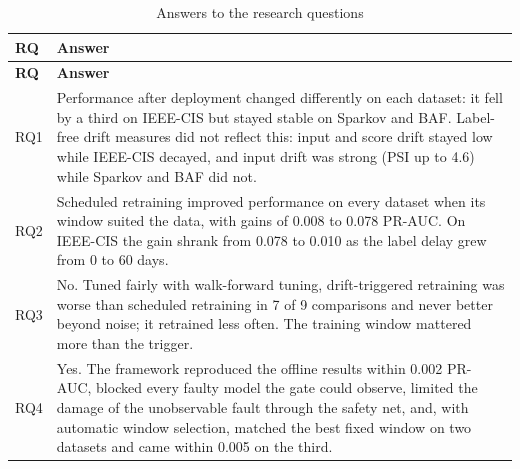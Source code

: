 {\footnotesize
\begin{longtable}{>{\raggedright\arraybackslash}p{}>{\raggedright\arraybackslash}p{}}
\caption{Answers to the research questions}\label{tab:answers}\\
\toprule
\textbf{RQ} & \textbf{Answer} \\
\midrule
\endfirsthead
\toprule
\textbf{RQ} & \textbf{Answer} \\
\midrule
\endhead
RQ1 & Performance after deployment changed differently on each dataset: it fell by a third on IEEE-CIS but stayed stable on Sparkov and BAF. Label-free drift measures did not reflect this: input and score drift stayed low while IEEE-CIS decayed, and input drift was strong (PSI up to 4.6) while Sparkov and BAF did not. \\ \midrule
RQ2 & Scheduled retraining improved performance on every dataset when its window suited the data, with gains of 0.008 to 0.078 PR-AUC. On IEEE-CIS the gain shrank from 0.078 to 0.010 as the label delay grew from 0 to 60 days. \\ \midrule
RQ3 & No. Tuned fairly with walk-forward tuning, drift-triggered retraining was worse than scheduled retraining in 7 of 9 comparisons and never better beyond noise; it retrained less often. The training window mattered more than the trigger. \\ \midrule
RQ4 & Yes. The framework reproduced the offline results within 0.002 PR-AUC, blocked every faulty model the gate could observe, limited the damage of the unobservable fault through the safety net, and, with automatic window selection, matched the best fixed window on two datasets and came within 0.005 on the third. \\ \bottomrule
\end{longtable}
}
